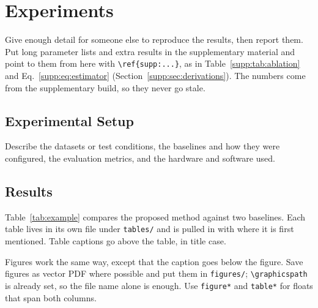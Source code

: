 \section{Experiments}
\label{sec:experiments}

Give enough detail for someone else to reproduce the results, then report them. Put long parameter lists and extra results in the supplementary material and point to them from here with \verb|\ref{supp:...}|, as in Table~\ref{supp:tab:ablation} and Eq.~\eqref{supp:eq:estimator} (Section~\ref{supp:sec:derivations}). The numbers come from the supplementary build, so they never go stale.

\subsection{Experimental Setup}
\label{sec:setup}
Describe the datasets or test conditions, the baselines and how they were configured, the evaluation metrics, and the hardware and software used.

\subsection{Results}
\label{sec:results}
Table~\ref{tab:example} compares the proposed method against two baselines. Each table lives in its own file under \texttt{tables/} and is pulled in with \verb|| where it is first mentioned. Table captions go above the table, in title case.



Figures work the same way, except that the caption goes below the figure. Save figures as vector PDF where possible and put them in \texttt{figures/}; \verb|\graphicspath| is already set, so the file name alone is enough. Use \verb|figure*| and \verb|table*| for floats that span both columns.

